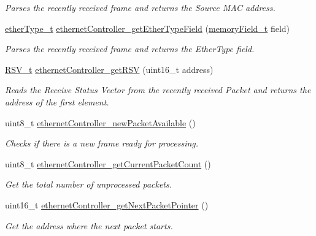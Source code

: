 \begin{DoxyCompactItemize}
\begin{DoxyCompactList}\small\item\em Parses the recently received frame and returns the Source M\+AC address. \end{DoxyCompactList}\item 
\mbox{\hyperlink{group__ethernet_ga467703afefdcaf7893a7da3eb63280ed}{ether\+Type\+\_\+t}} \mbox{\hyperlink{group__data__reception_ga84354a03e54526ac8a820650886458f4}{ethernet\+Controller\+\_\+get\+Ether\+Type\+Field}} (\mbox{\hyperlink{group__memory_ga1d04d80fae40964f55d2df46b5d64785}{memory\+Field\+\_\+t}} field)
\begin{DoxyCompactList}\small\item\em Parses the recently received frame and returns the Ether\+Type field. \end{DoxyCompactList}\item 
\mbox{\hyperlink{group__rsv_gaf7fd94a9424fccb0aafa846f27a43099}{R\+S\+V\+\_\+t}} \mbox{\hyperlink{group__data__reception_ga1d8cfd56b6020b891ba408c18789129c}{ethernet\+Controller\+\_\+get\+R\+SV}} (uint16\+\_\+t address)
\begin{DoxyCompactList}\small\item\em Reads the Receive Status Vector from the recently received Packet and returns the address of the first element. \end{DoxyCompactList}\item 
uint8\+\_\+t \mbox{\hyperlink{group__data__reception_gae030bd0d97a72b4c38d3ac55132dd7f3}{ethernet\+Controller\+\_\+new\+Packet\+Available}} ()
\begin{DoxyCompactList}\small\item\em Checks if there is a new frame ready for processing. \end{DoxyCompactList}\item 
uint8\+\_\+t \mbox{\hyperlink{group__data__reception_ga0ab2398cb48efd9a8943a5c5b2872b0c}{ethernet\+Controller\+\_\+get\+Current\+Packet\+Count}} ()
\begin{DoxyCompactList}\small\item\em Get the total number of unprocessed packets. \end{DoxyCompactList}\item 
uint16\+\_\+t \mbox{\hyperlink{group__data__reception_ga6155805a8511681932051b00a0032f9f}{ethernet\+Controller\+\_\+get\+Next\+Packet\+Pointer}} ()
\begin{DoxyCompactList}\small\item\em Get the address where the next packet starts. \end{DoxyCompactList}\item 

\end{DoxyCompactItemize}
